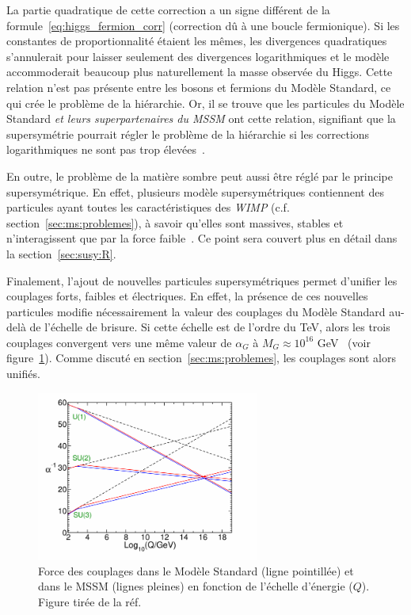 La partie quadratique de cette correction a un signe différent de la
formule~\ref{eq:higgs_fermion_corr} (correction dû à une boucle
fermionique). Si les constantes de proportionnalité étaient les mêmes,
les divergences quadratiques s'annulerait pour laisser seulement des
divergences logarithmiques et le modèle accommoderait beaucoup plus
naturellement la masse observée du Higgs. Cette relation n'est pas
présente entre les bosons et fermions du Modèle Standard, ce qui crée
le problème de la hiérarchie.  Or, il se trouve que les particules du
Modèle Standard \emph{et leurs superpartenaires du MSSM} ont
cette relation, signifiant que la supersymétrie pourrait régler le
problème de la hiérarchie si les corrections logarithmiques ne sont
pas trop élevées~\cite{martin_supersymmetry_1997}.

En outre, le problème de la matière sombre peut aussi être réglé par
le principe supersymétrique. En effet, plusieurs modèle
supersymétriques contiennent des particules ayant toutes les
caractéristiques des \emph{WIMP}
(c.f. section~\ref{sec:ms:problemes}), à savoir qu'elles sont
massives, stables et n'interagissent que par la force
faible~\cite{olive_susy1_2014}. Ce point sera couvert plus en détail
dans la section~\ref{sec:susy:R}.

Finalement, l'ajout de nouvelles particules supersymétriques permet
d'unifier les couplages forts, faibles et électriques. En effet, la
présence de ces nouvelles particules modifie nécessairement la valeur
des couplages du Modèle Standard au-delà de l'échelle de brisure. Si
cette échelle est de l'ordre du TeV, alors les trois couplages
convergent vers une même valeur de $\alpha_G$ à $M_G \approx 10^{16}$
GeV~\cite{thomson_modern_2013} (voir figure~\ref{fig:unification}).
Comme discuté en section~\ref{sec:ms:problemes}, les couplages sont
alors unifiés.

\begin{figure}
  \centering
  \includegraphics[width=0.65\textwidth]{running_susy.pdf}
  \caption{Force des couplages dans le Modèle Standard (ligne
    pointillée) et dans le MSSM (lignes pleines) en fonction de
    l'échelle d'énergie ($Q$). Figure tirée de la
    réf.~\cite{martin_supersymmetry_1997}}
  \label{fig:unification}
\end{figure}

